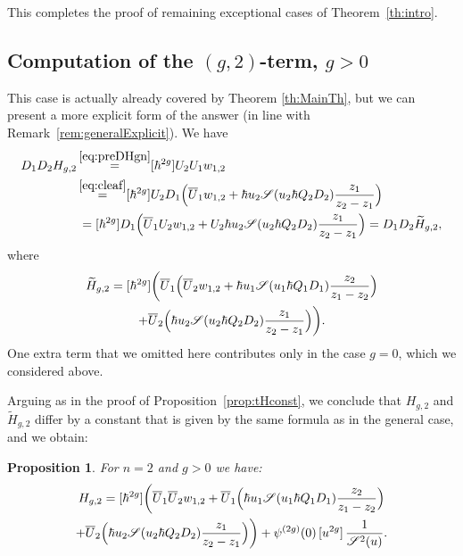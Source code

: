 \documentclass[JEP,XML,SOM,Unicode,NoEqCountersInSection,NoFloatCountersInSection]{cedram}
\let\mathcal\mathscr
\theoremstyle{plain}
\newtheorem{proposition}[theorem]{Proposition}
\theoremstyle{definition}
\theoremstyle{remark}
\newcommand{\cS}{\mathcal{S}}
\begin{document}
This completes the proof of remaining exceptional cases of Theorem~\ref{th:intro}.

\subsection{Computation of the \texorpdfstring{$(g,2)$}{(g,2)}-term, \texorpdfstring{$g>0$}{g>0}}\label{sec:g2}
This case is actually already covered by Theorem \ref{th:MainTh}, but we can present a more explicit form of the answer (in line with Remark~\ref{rem:generalExplicit}). We have\vspace*{-3pt}
\begin{align*}
D_1D_2H_{g,2}&\mathop{=}^{\eqref{eq:preDHgn}}[\hbar^{2g}]U_2U_1w_{1,2}\\
&\mathop{=}^{\eqref{eq:cleaf}}
[\hbar^{2g}]U_2
D_1 \Bigl(\overline{U}_1 w_{1,2} + \hbar u_2 \cS(u_2\hbar Q_2D_2)\frac{z_1}{z_2-z_1}\Bigr)
\\
&\,=
[\hbar^{2g}]
D_1 \Bigl(\overline{U}_1 U_2 w_{1,2} + U_2\hbar u_2 \cS(u_2\hbar Q_2D_2)\frac{z_1}{z_2-z_1}\Bigr)
=
D_1 D_2\widetilde H_{g,2},
\end{align*}
where\vspace*{-3pt}
\begin{multline*}
\widetilde H_{g,2}=[\hbar^{2g}]\biggl(\overline{U}_1\Bigl(\overline{U}_2 w_{1,2}
+ \hbar u_1 \cS(u_1\hbar Q_1D_1)\frac{z_2}{z_1-z_2}\Bigr)\\
+\overline{U}_2\Bigl(\hbar u_2 \cS(u_2\hbar Q_2D_2)\frac{z_1}{z_2-z_1}\Bigr) \biggr).
\end{multline*}
One extra term that we omitted here contributes only in the case $g=0$, which we considered above.

Arguing as in the proof of Proposition~\ref{prop:tHconst}, we conclude that $H_{g,2}$ and $\widetilde H_{g,2}$ differ by a constant that is given by the same formula as in the general case, and we obtain:

\begin{proposition} For $n=2$ and $g>0$ we have:
\begin{multline*}
H_{g,2} =[\hbar^{2g}]\biggl(\overline{U}_1\overline{U}_2 w_{1,2}
+ \overline{U}_1\Bigl(\hbar u_1 \cS(u_1\hbar Q_1D_1)\frac{z_2}{z_1-z_2}\Bigr)
\\
+\overline{U}_2\Bigl(\hbar u_2 \cS(u_2\hbar Q_2D_2)\frac{z_1}{z_2-z_1}\Bigr)\biggr)
+ \psi^{(2g)}(0)\,[u^{2g}]\,\frac1{\cS^2(u)}.
\end{multline*}
\end{proposition}
\end{document}
